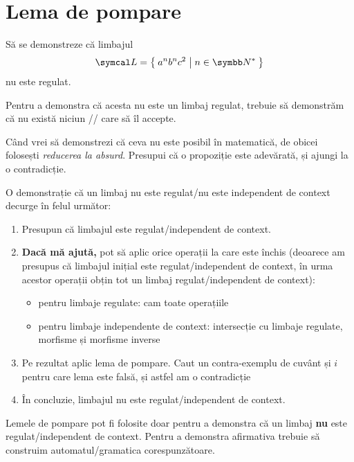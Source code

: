 \section*{Lema de pompare}

Să se demonstreze că limbajul
\[\limbaj = \Set{ a^n b^n c^2 | n \in \naturals^* }\]
nu este regulat.

Pentru a demonstra că acesta nu este un limbaj regulat, trebuie să demonstrăm că nu există niciun \dfa/\nfa/\lnfa{} care să îl accepte.

Când vrei să demonstrezi că ceva nu este posibil în matematică, de obicei folosești \emph{reducerea la absurd}. Presupui că o propoziție este adevărată, și ajungi la o contradicție.

O demonstrație că un limbaj nu este regulat/nu este independent de context decurge în felul următor:
\begin{enumerate}
    \item Presupun că limbajul este regulat/independent de context.

    \item \textbf{Dacă mă ajută,} pot să aplic orice operații la care este închis (deoarece am presupus că limbajul inițial este regulat/independent de context, în urma acestor operații obțin tot un limbaj regulat/independent de context):
          \begin{itemize}
              \item pentru limbaje regulate: cam toate operațiile
              \item pentru limbaje independente de context: intersecție cu limbaje regulate, morfisme și morfisme inverse
          \end{itemize}

    \item Pe rezultat aplic lema de pompare.
          Caut un contra-exemplu de cuvânt și \(i\) pentru care lema este falsă, și astfel am o contradicție

    \item În concluzie, limbajul nu este regulat/independent de context.
\end{enumerate}

\begin{observation}
    Lemele de pompare pot fi folosite doar pentru a demonstra că un limbaj \textbf{nu} este regulat/independent de context. Pentru a demonstra afirmativa trebuie să construim automatul/gramatica corespunzătoare.
\end{observation}

